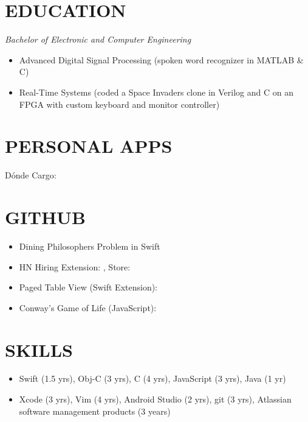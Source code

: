 \documentclass[margin]{res}
\begin{document}
\begin{resume}
\section{EDUCATION} {\sl Bachelor of Electronic and Computer Engineering}
		\begin{itemize}
                \item Advanced Digital Signal Processing (spoken word recognizer 
                in MATLAB \& C)
                \item Real-Time Systems (coded a Space Invaders clone in Verilog
                 and C on an FPGA with custom keyboard and monitor controller)
                 \end{itemize}

\section{PERSONAL APPS}
		D\'onde Cargo: \\


\section{GITHUB}       
	\begin{itemize} 
	    \item Dining Philosophers Problem in Swift 
	    \item HN Hiring Extension: , Store: 
	    \item Paged Table View (Swift Extension): 
	    \item Conway's Game of Life (JavaScript): 
	\end{itemize}
                
\section{SKILLS} 
	\begin{itemize}
	\item Swift (1.5 yrs), Obj-C (3 yrs), C (4 yrs), JavaScript (3 yrs), Java (1 yr)
	\item Xcode (3 yrs), Vim (4 yrs), Android Studio (2 yrs), git (3 yrs), Atlassian software management products (3 years) 
	\end{itemize}

\end{resume}
\end{document}
